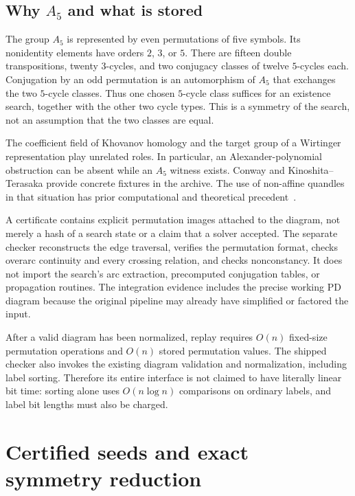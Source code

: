 \subsection{Why \texorpdfstring{$A_5$}{A5} and what is stored}

The group $A_5$ is represented by even permutations of five symbols. Its
nonidentity elements have orders $2$, $3$, or $5$. There are fifteen
double transpositions, twenty $3$-cycles, and two conjugacy classes of
twelve $5$-cycles each. Conjugation by an odd permutation is an
automorphism of $A_5$ that exchanges the two $5$-cycle classes. Thus one
chosen $5$-cycle class suffices for an existence search, together with
the other two cycle types. This is a symmetry of the search, not an
assumption that the two classes are equal.

The coefficient field of Khovanov homology and the target group of a
Wirtinger representation play unrelated roles. In particular, an
Alexander-polynomial obstruction can be absent while an $A_5$ witness
exists. Conway and Kinoshita--Terasaka provide concrete fixtures in the
archive. The use of non-affine quandles in that situation has prior
computational and theoretical precedent~\cite{clark,fish}.

A certificate contains explicit permutation images attached to the
diagram, not merely a hash of a search state or a claim that a solver
accepted. The separate checker reconstructs the edge traversal, verifies
the permutation format, checks overarc continuity and every crossing
relation, and checks nonconstancy. It does not import the search's arc
extraction, precomputed conjugation tables, or propagation routines.
The integration evidence includes the precise working PD diagram because
the original pipeline may already have simplified or factored the input.

After a valid diagram has been normalized, replay requires $O(n)$
fixed-size permutation operations and $O(n)$ stored permutation values.
The shipped checker also invokes the existing diagram validation and
normalization, including label sorting. Therefore its entire interface
is not claimed to have literally linear bit time: sorting alone uses
$O(n\log n)$ comparisons on ordinary labels, and label bit lengths must
also be charged.

\section{Certified seeds and exact symmetry reduction}
\label{sec:seeds}


